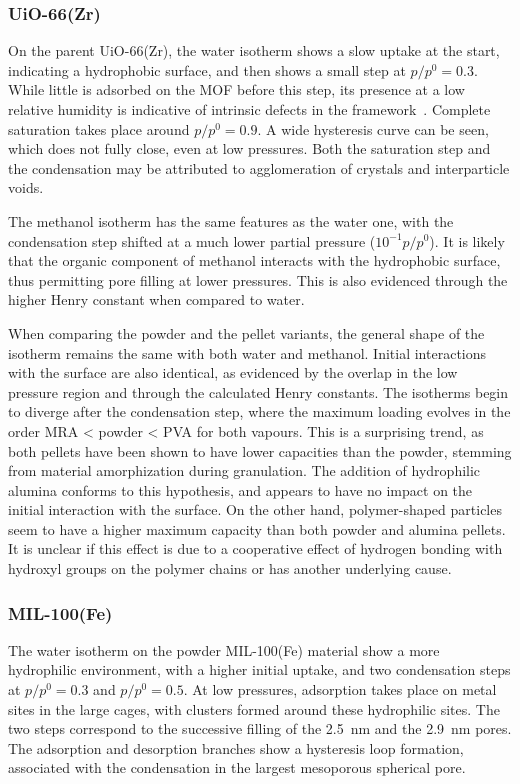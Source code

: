 \subsubsection{UiO-66(Zr)}

On the parent UiO-66(Zr), the water isotherm shows a slow uptake 
at the start, indicating a hydrophobic surface, and then shows 
a small step at \(p/p^0 = 0.3\). While little is 
adsorbed on the MOF before this step, its presence 
at a low relative humidity is indicative of intrinsic defects
in the framework~\cite{ghoshWaterAdsorptionUiO662014}.
Complete saturation takes place around \(p/p^0 = 0.9\). 
A wide hysteresis curve can be seen, which 
does not fully close, even at low pressures. Both the
saturation step and the condensation may be attributed 
to agglomeration of crystals and interparticle voids.

The methanol isotherm has the same features as the water
one, with the condensation step shifted at a much lower 
partial pressure (\(10^{-1} p/p^0\)). It is likely that
the organic component of methanol interacts with the
hydrophobic surface, thus permitting pore filling at
lower pressures. This is also evidenced through the higher
Henry constant when compared to water.

When comparing the powder and the pellet variants, the 
general shape of the isotherm remains the same with both
water and methanol. Initial interactions with the surface are also
identical, as evidenced by the overlap in the low pressure region
and through the calculated Henry constants. The isotherms 
begin to diverge after the condensation step, where the 
maximum loading evolves in the order MRA < powder < PVA
for both vapours. This is a surprising trend, as both pellets
have been shown to have lower capacities than the powder,
stemming from material amorphization during granulation.
The addition of hydrophilic alumina conforms to this hypothesis,
and appears to have no impact on the initial interaction with 
the surface. On the other hand, polymer-shaped particles
seem to have a higher maximum capacity than both powder and 
alumina pellets. It is unclear if this effect is due to a 
cooperative effect of hydrogen bonding with hydroxyl groups 
on the polymer chains or has another underlying cause.


\subsubsection{MIL-100(Fe)}

The water isotherm on the powder MIL-100(Fe) material show a more 
hydrophilic environment, with a higher initial uptake, and two 
condensation steps at \(p/p^0 = 0.3\) and \(p/p^0 = 0.5\).
At low pressures, adsorption takes place on metal sites in the 
large cages, with clusters formed around these hydrophilic
sites. The two steps correspond to the successive filling of the 
\SI{2.5}{\nano\metre} and the \SI{2.9}{\nano\metre} pores. The
adsorption and desorption branches show a hysteresis loop 
formation, associated with the condensation in the largest 
mesoporous spherical pore.

